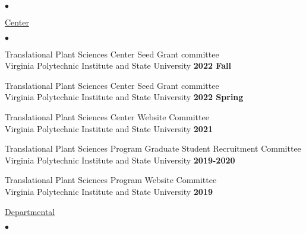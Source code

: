\documentclass[margin,line,10pt]{res}
\newenvironment{list2}{
  \begin{list}{$\bullet$}{%
      \setlength{\itemsep}{0in}
      \setlength{\parsep}{0in} \setlength{\parskip}{0in}
      \setlength{\topsep}{0in} \setlength{\partopsep}{0in} 
      \setlength{\leftmargin}{0.2in}}}{\end{list}}
\begin{document}
\begin{resume}
\begin{list2}
\end{list2}


\begin{flushleft}
  \hspace{0.3cm} \underline{Center}
\end{flushleft}
\begin{list2}

    \item Translational Plant Sciences Center Seed Grant committee \\
  Virginia Polytechnic Institute and State University  \hfill \textbf{2022 Fall}\\

  \vspace{0.3cm}
  
  \item Translational Plant Sciences Center Seed Grant committee \\
  Virginia Polytechnic Institute and State University  \hfill \textbf{2022 Spring}\\

  \vspace{0.3cm}

\item Translational Plant Sciences Center Website Committee \\
  Virginia Polytechnic Institute and State University  \hfill \textbf{2021}\\

  \vspace{0.3cm}


  \item Translational Plant Sciences Program Graduate Student Recruitment Committee \\
  Virginia Polytechnic Institute and State University  \hfill \textbf{2019-2020}\\

  \vspace{0.3cm}
  
\item Translational Plant Sciences Program Website Committee \\
  Virginia Polytechnic Institute and State University  \hfill \textbf{2019}\\

  
\end{list2}

  
\begin{flushleft}
  \hspace{0.3cm} \underline{Departmental}
\end{flushleft}
\begin{list2}


\end{list2}
\end{resume}
\end{document}
